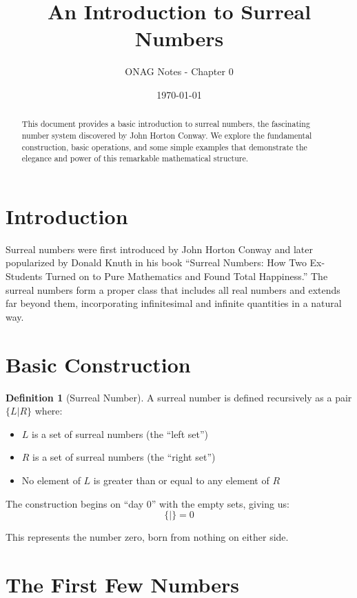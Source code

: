 \documentclass[11pt,a4paper]{article}
\title{An Introduction to Surreal Numbers}
\author{ONAG Notes - Chapter 0}
\date{\today}
\theoremstyle{definition}
\newtheorem{definition}{Definition}[section]
\begin{document}
\maketitle

\begin{abstract}
This document provides a basic introduction to surreal numbers, the fascinating number system discovered by John Horton Conway. We explore the fundamental construction, basic operations, and some simple examples that demonstrate the elegance and power of this remarkable mathematical structure.
\end{abstract}

\section{Introduction}

Surreal numbers were first introduced by John Horton Conway and later popularized by Donald Knuth in his book ``Surreal Numbers: How Two Ex-Students Turned on to Pure Mathematics and Found Total Happiness.'' The surreal numbers form a proper class that includes all real numbers and extends far beyond them, incorporating infinitesimal and infinite quantities in a natural way.

\section{Basic Construction}

\begin{definition}[Surreal Number]
A surreal number is defined recursively as a pair $\{L|R\}$ where:
\begin{itemize}
    \item $L$ is a set of surreal numbers (the ``left set'')
    \item $R$ is a set of surreal numbers (the ``right set'')  
    \item No element of $L$ is greater than or equal to any element of $R$
\end{itemize}
\end{definition}

The construction begins on ``day 0'' with the empty sets, giving us:
$$\{|\} = 0$$

This represents the number zero, born from nothing on either side.

\section{The First Few Numbers}
\end{document}

